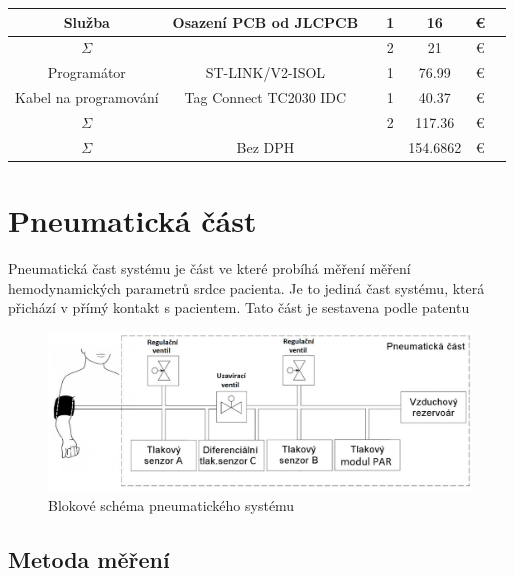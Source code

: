 \begin{table}[H]
\begin{ctucolortab}
\begin{tabular}{ccccccc}
            Služba                & Osazení PCB od JLCPCB  &               & 1     & 16       & €        & \\
            \bottomrule
            $\Sigma$              &                        &               & 2     & 21       & €        & \\
            \bottomrule
            Programátor           & ST-LINK/V2-ISOL        &               & 1     & 76.99    & €        & \\
            Kabel na programování & Tag Connect TC2030 IDC &               & 1     & 40.37    & €        & \\
            \bottomrule
            $\Sigma$              &                        &               & 2     & 117.36   & €        & \\
            \bottomrule
            \bottomrule
            $\Sigma$              & Bez DPH                &               &       & 154.6862 & €        & \\
            \bottomrule
        \end{tabular}
    \end{ctucolortab}
\end{table}
\section{Pneumatická část}
Pneumatická čast systému je část ve které probíhá měření měření hemodynamických parametrů srdce pacienta. Je to jediná čast systému, která přichází v přímý kontakt s pacientem. Tato část je sestavena podle
patentu \cite[US Patent US10251567]{cite:2}
\begin{figure}[H]
    \includegraphics[width=1\linewidth]{pictures/blokove_schema_pneu.jpg}
    \caption{Blokové schéma pneumatického systému}
    \label{fig:pneu_block}
\end{figure}
\subsection{Metoda měření}



